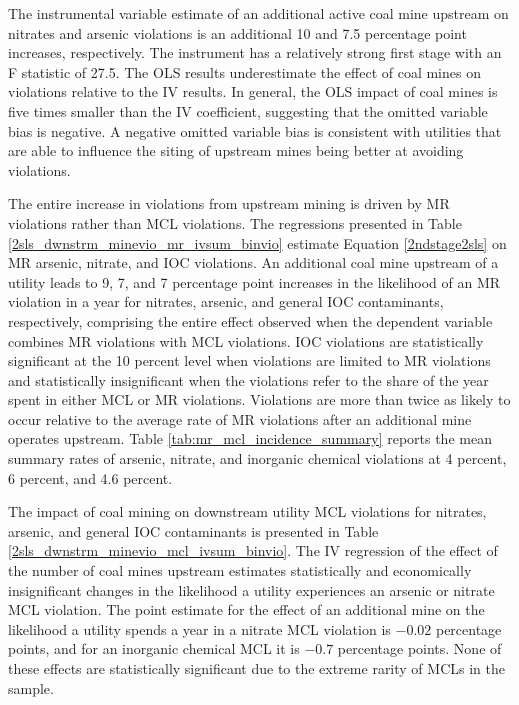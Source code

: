 \documentclass{article}
\begin{document}
The instrumental variable estimate of an additional active coal mine upstream on nitrates and arsenic violations is an additional 10 and 7.5 percentage point increases, respectively. The instrument has a relatively strong first stage with an F statistic of 27.5. The OLS results underestimate the effect of coal mines on violations relative to the IV results. In general, the OLS impact of coal mines is five times smaller than the IV coefficient, suggesting that the omitted variable bias is negative. A negative omitted variable bias is consistent with utilities that are able to influence the siting of upstream mines being better at avoiding violations.

The entire increase in violations from upstream mining is driven by MR violations rather than MCL violations. The regressions presented in Table \ref{2sls_dwnstrm_minevio_mr_ivsum_binvio} estimate Equation \ref{2ndstage2sls} on MR arsenic, nitrate, and IOC violations. An additional coal mine upstream of a utility leads to 9, 7, and 7 percentage point increases in the likelihood of an MR violation in a year for nitrates, arsenic, and general IOC contaminants, respectively, comprising the entire effect observed when the dependent variable combines MR violations with MCL violations. IOC violations are statistically significant at the 10 percent level when violations are limited to MR violations and statistically insignificant when the violations refer to the share of the year spent in either MCL or MR violations. Violations are more than twice as likely to occur relative to the average rate of MR violations after an additional mine operates upstream. Table \ref{tab:mr_mcl_incidence_summary} reports the mean summary rates of arsenic, nitrate, and inorganic chemical violations at 4 percent, 6 percent, and 4.6 percent.

The impact of coal mining on downstream utility MCL violations for nitrates, arsenic, and general IOC contaminants is presented in Table \ref{2sls_dwnstrm_minevio_mcl_ivsum_binvio}. The IV regression of the effect of the number of coal mines upstream estimates statistically and economically insignificant changes in the likelihood a utility experiences an arsenic or nitrate MCL violation. The point estimate for the effect of an additional mine on the likelihood a utility spends a year in a nitrate MCL violation is $-0.02$ percentage points, and for an inorganic chemical MCL it is $-0.7$ percentage points. None of these effects are statistically significant due to the extreme rarity of MCLs in the sample.
\end{document}
